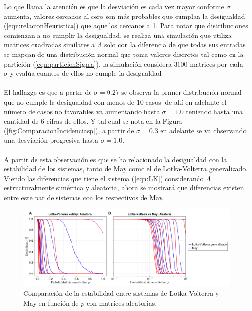 Lo que llama la atención es que la desviación es cada vez mayor conforme $\sigma$ aumenta, valores cercanos al cero son más probables que cumplan la desigualdad (\ref{eqn:relacionHeuristica}) que aquellos cercanos a 1. Para notar que distribuciones comienzan a no cumplir la desigualdad, se realiza una simulación que utiliza matrices cuadradas similares a $\Lambda$ solo con la diferencia de que todas sus entradas se mapean de una distribución normal que toma valores discretos tal como en la partición (\ref{eqn:particionSigma}), la simulación considera 3000 matrices por cada $\sigma$ y evalúa cuantos de ellos no cumple la desigualdad. \\
\\
El hallazgo es que a partir de $\sigma=0.27$ se observa la primer distribución normal que no cumple la desigualdad con menos de 10 casos, de ahí en adelante el número de casos no favorables va aumentando hasta $\sigma=1.0$ teniendo hasta una cantidad de 6 cifras de ellos. Y tal cual se nota en la Figura (\ref{fig:ComparacionIncidenciasp}), a partir de $\sigma=0.3$ en adelante se va observando una desviación progresiva hasta $\sigma=1.0$.\\
\\
A partir de esta observación es que se ha relacionado la desigualdad con la estabilidad de los sistemas, tanto de May como el de Lotka-Volterra generalizado. Viendo las diferencias que tiene el sistema (\ref{eqn:LK}) considerando $\Lambda$ estructuralmente simétrica y aleatoria, ahora se mostrará que diferencias existen entre este par de sistemas con los respectivos de May.
\begin{figure}[h!]
\centering
\includegraphics[scale=0.16]{../Imagenes/ComparacionLKMay.png}
\caption{Comparación de la estabilidad entre sistemas de Lotka-Volterra y May en función de $p$ con matrices aleatorias.}
\label{fig:ComparacionLKMay}
\end{figure}


